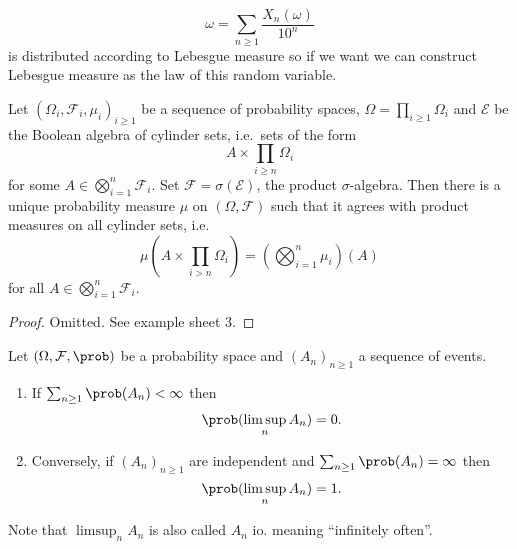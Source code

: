 \documentclass[a4paper]{article}
\renewcommand{\P}{\prob} %
\begin{document}
\begin{remark}
  \[
    \omega = \sum_{n \geq 1} \frac{X_n(\omega)}{10^n}
  \]
  is distributed according to Lebesgue measure so if we want we can construct Lebesgue measure as the law of this random variable.
\end{remark}

\begin{proposition}
  Let \((\Omega_i, \mathcal F_i, \mu_i)_{i \geq 1}\) be a sequence of probability spaces, \(\Omega = \prod_{i \geq 1} \Omega_i\) and \(\mathcal E\) be the Boolean algebra of cylinder sets, i.e.\ sets of the form
  \[
    A \times \prod_{i \geq n} \Omega_i
  \]
  for some \(A \in \bigotimes_{i = 1}^n \mathcal F_i\). Set \(\mathcal F = \sigma(\mathcal E)\), the product \(\sigma\)-algebra. Then there is a unique probability measure \(\mu\) on \((\Omega, \mathcal F)\) such that it agrees with product measures on all cylinder sets, i.e.
  \[
    \mu(A \times \prod_{i > n} \Omega_i) = (\bigotimes_{i = 1}^n \mu_i)(A)
  \]
  for all \(A \in \bigotimes_{i = 1}^n \mathcal F_i\).
\end{proposition}

\begin{proof}
  Omitted. See example sheet 3.
\end{proof}

\begin{lemma}
  Let \((\Omega, \mathcal F, \P)\) be a probability space and \((A_n)_{n \geq 1}\) a sequence of events.
  \begin{enumerate}
  \item If \(\sum_{n \geq 1} \P(A_n) < \infty\) then
    \[
      \P(\limsup_n A_n) = 0.
    \]
  \item Conversely, if \((A_n)_{n \geq 1}\) are independent and \(\sum_{n \geq 1} \P(A_n) = \infty\) then
    \[
      \P(\limsup_n A_n) = 1.
    \]
  \end{enumerate}
\end{lemma}

Note that \(\limsup_n A_n\) is also called \(A_n\) io. meaning ``infinitely often''.
\end{document}
